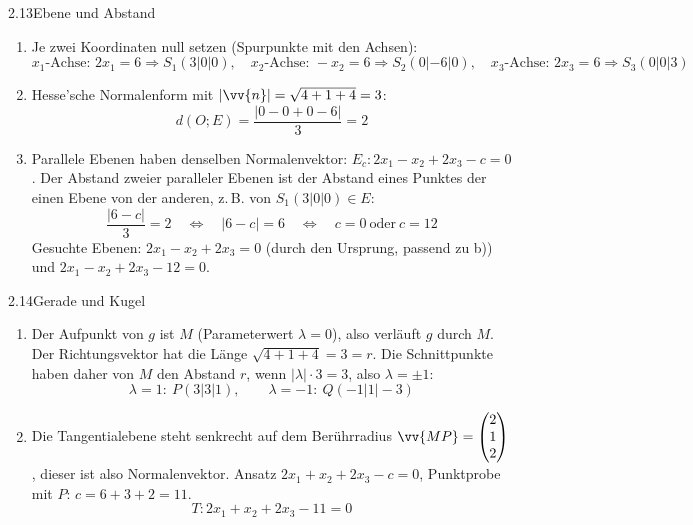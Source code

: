 \begin{loesung}{2.13}{Ebene und Abstand}
\begin{enumerate}[label=\alph*)]
  \item Je zwei Koordinaten null setzen (Spurpunkte mit den Achsen):
  \[x_1\text{-Achse: } 2x_1 = 6\Rightarrow S_1(3|0|0),\quad x_2\text{-Achse: } -x_2 = 6\Rightarrow S_2(0|-6|0),\quad x_3\text{-Achse: } 2x_3 = 6\Rightarrow S_3(0|0|3)\]
  \item Hesse'sche Normalenform mit $|\vv{n}| = \sqrt{4+1+4} = 3$:
  \[d(O;E) = \dfrac{|0-0+0-6|}{3} = 2\]
  \item Parallele Ebenen haben denselben Normalenvektor: $E_c: 2x_1-x_2+2x_3-c = 0$. Der Abstand zweier paralleler Ebenen ist der Abstand eines Punktes der einen Ebene von der anderen, z.\,B. von $S_1(3|0|0)\in E$:
  \[\dfrac{|6-c|}{3} = 2\quad\Longleftrightarrow\quad|6-c| = 6\quad\Longleftrightarrow\quad c = 0\ \text{oder}\ c = 12\]
  Gesuchte Ebenen: $2x_1-x_2+2x_3 = 0$ (durch den Ursprung, passend zu b)) und $2x_1-x_2+2x_3-12 = 0$.
\end{enumerate}
\end{loesung}

\begin{loesung}{2.14}{Gerade und Kugel}
\begin{enumerate}[label=\alph*)]
  \item Der Aufpunkt von $g$ ist $M$ (Parameterwert $\lambda=0$), also verläuft $g$ durch $M$.\\
  Der Richtungsvektor hat die Länge $\sqrt{4+1+4} = 3 = r$. Die Schnittpunkte haben daher von $M$ den Abstand $r$, wenn $|\lambda|\cdot 3 = 3$, also $\lambda = \pm 1$:
  \[\lambda = 1:\ P(3|3|1),\qquad\lambda = -1:\ Q(-1|1|-3)\]
  \item Die Tangentialebene steht senkrecht auf dem Berührradius $\vv{MP} = \begin{pmatrix} 2\\ 1\\ 2\end{pmatrix}$, dieser ist also Normalenvektor. Ansatz $2x_1+x_2+2x_3-c = 0$, Punktprobe mit $P$: $c = 6+3+2 = 11$.
  \[T: 2x_1+x_2+2x_3-11 = 0\]
\end{enumerate}
\end{loesung}

